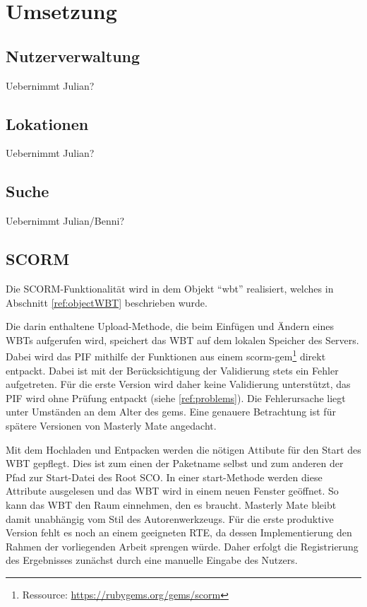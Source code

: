 \chapter{Umsetzung}\label{ref:chaptImplementation}

\section{Nutzerverwaltung}
\begin{k}
Uebernimmt Julian?
\end{k}

\section{Lokationen}
\begin{k}
Uebernimmt Julian?
\end{k}

\section{Suche}
\begin{k}
Uebernimmt Julian/Benni?
\end{k}

\section{SCORM}
Die SCORM-Funktionalität wird in dem Objekt "`wbt"' realisiert, welches in
Abschnitt \ref{ref:objectWBT} beschrieben wurde. 

Die darin enthaltene Upload-Methode, die beim Einfügen und Ändern eines WBTs
aufgerufen wird, speichert das WBT auf dem lokalen Speicher des Servers. Dabei
wird das \ac{PIF} mithilfe der Funktionen aus einem
scorm-gem\footnote{Ressource: \url{https://rubygems.org/gems/scorm}} direkt
entpackt. Dabei ist mit der Berücksichtigung der Validierung stets ein Fehler
aufgetreten. Für die erste Version wird daher keine Validierung unterstützt, das
PIF wird ohne Prüfung entpackt (siehe \ref{ref:problems}). Die Fehlerursache
liegt unter Umständen an dem Alter des gems. Eine genauere Betrachtung ist für
spätere Versionen von Masterly Mate angedacht. 

Mit dem Hochladen und Entpacken werden die nötigen Attibute für den Start des
WBT gepflegt. Dies ist zum einen der Paketname selbst und zum anderen der Pfad
zur Start-Datei des Root SCO. In einer start-Methode werden diese Attribute
ausgelesen und das WBT wird in einem neuen Fenster geöffnet. So kann das WBT den
Raum einnehmen, den es braucht. Masterly Mate bleibt damit unabhängig vom Stil
des Autorenwerkzeugs. Für die erste produktive Version fehlt es noch an einem
geeigneten RTE, da dessen Implementierung den Rahmen der vorliegenden Arbeit
sprengen würde. Daher erfolgt die Registrierung des Ergebnisses zunächst durch
eine manuelle Eingabe des Nutzers.

